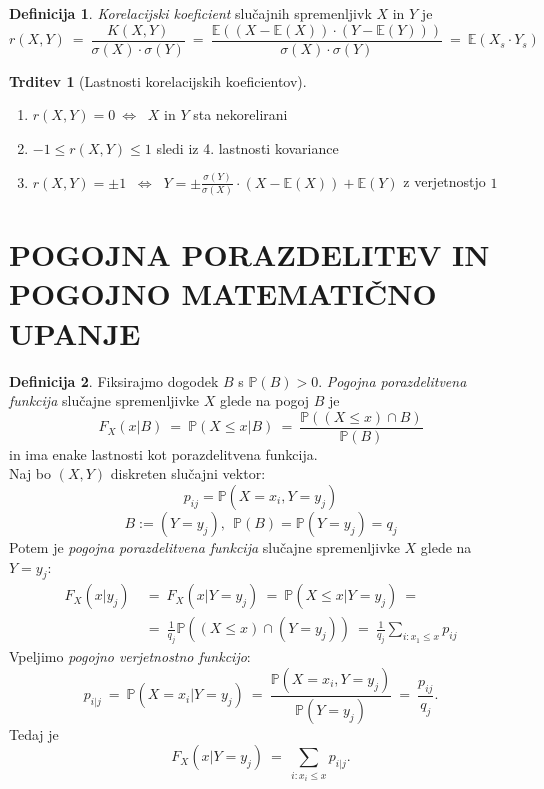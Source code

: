 \documentclass[11pt]{article}
\theoremstyle{definition}
\newtheorem{definicija}{Definicija}[section]
\theoremstyle{definition}
\newtheorem{trditev}{Trditev}[section]
\theoremstyle{definition}
\begin{document}
\begin{definicija}

\textit{Korelacijski koeficient} slučajnih spremenljivk $X$ in $Y$ je
$$r(X,Y) ~=~ \frac{K(X, Y)}{\sigma(X) \cdot \sigma(Y)} ~=~ \frac{\mathbb{E}((X - \mathbb{E}(X)) \cdot (Y - \mathbb{E}(Y)))}{\sigma(X) \cdot \sigma(Y)} ~=~ \mathbb{E}(X_s \cdot Y_s)$$

\end{definicija}
\vspace{0.5cm}

\begin{trditev}[Lastnosti korelacijskih koeficientov]
~\\
\begin{enumerate}
	\item $r(X,Y) = 0 ~\Leftrightarrow~$ $X$ in $Y$ sta nekorelirani
	\item $-1 \leq r(X,Y) \leq 1$ sledi iz 4. lastnosti kovariance
	\item $r(X,Y) = \pm 1$ $~\Leftrightarrow~$ $Y = \pm \frac{\sigma(Y)}{\sigma(X)} \cdot (X - \mathbb{E}(X)) + \mathbb{E}(Y)$ z verjetnostjo $1$
\end{enumerate}
\end{trditev}
\vspace{0.5cm}

\pagebreak


\section{POGOJNA PORAZDELITEV IN POGOJNO MATEMATIČNO UPANJE}
\vspace{0.5cm}

\begin{definicija}

Fiksirajmo dogodek $B$ s $\mathbb{P}(B) > 0$. \textit{Pogojna porazdelitvena funkcija} slučajne spremenljivke $X$ glede na pogoj $B$ je
$$F_X(x | B) ~=~ \mathbb{P}(X \leq x | B) ~=~ \frac{\mathbb{P}((X \leq x) \cap B)}{\mathbb{P}(B)}$$
in ima enake lastnosti kot porazdelitvena funkcija. \\

\noindent Naj bo $(X, Y)$ diskreten slučajni vektor: 
$$p_{ij} =  \mathbb{P}(X = x_i, Y = y_j)$$
$$B := (Y = y_j), ~~\mathbb{P}(B) = \mathbb{P}(Y = y_j) = q_j$$
Potem je \textit{pogojna porazdelitvena funkcija} slučajne spremenljivke $X$ glede na $Y = y_j$:
\begin{align*}
	F_X(x | y_j) ~&=~ F_X(x | Y = y_j) ~=~ \mathbb{P}(X \leq x |Y = y_j) ~= \\
	&=~ \frac{1}{q_j} \mathbb{P}((X \leq x) \cap (Y = y_j)) ~=~ \frac{1}{q_j} \sum_{i: x_1 \leq x} p_{ij}
\end{align*}
Vpeljimo  \textit{pogojno verjetnostno funkcijo}:
$$p_{i|j} ~=~ \mathbb{P}(X = x_i | Y = y_j) ~=~ \frac{\mathbb{P}(X = x_i, Y = y_j)}{\mathbb{P}(Y = y_j)} ~=~ \frac{p_{ij}}{q_j}.$$
Tedaj je 
$$F_X(x | Y = y_j) ~=~ \sum_{i: x_i \leq x} p_{i|j}.$$

\end{definicija}
\vspace{0.5cm}
\end{document}
